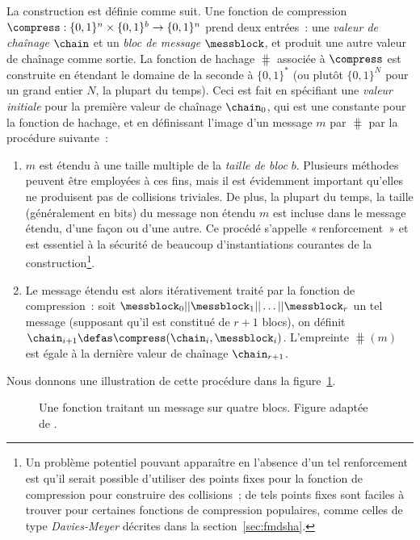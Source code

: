 La construction \merkdam est définie comme suit. Une fonction de compression
$\compress : \{0,1\}^n \times \{0,1\}^b \rightarrow \{0,1\}^n$
prend deux entrées~: une \emph{valeur de chaînage} $\chain$ et un \emph{bloc de message} $\messblock$, et produit une autre valeur de chaînage comme sortie.
La fonction de hachage
$\hash$ associée à $\compress$ est construite en étendant le domaine de la seconde à $\{0,1\}^*$ (ou plutôt $\{0,1\}^N$ pour un grand entier $N$, la plupart du temps).
Ceci est fait en spécifiant une \emph{valeur initiale} \iv pour la première valeur de chaînage
$\chain_0$, qui est une constante pour la fonction de hachage, et en définissant l'image d'un message
$m$ par $\hash$ par la procédure suivante~:
\begin{enumerate}
\item $m$ est étendu
à une taille multiple de la \emph{taille de bloc} $b$. Plusieurs méthodes peuvent être employées à ces fins, mais il est évidemment important
qu'elles ne produisent pas de collisions triviales. De plus, la plupart du temps, la taille (généralement en bits) du message non étendu
$m$ est incluse dans le message étendu, d'une façon ou d'une autre. Ce procédé s'appelle «\,renforcement \merkdam\,» et est essentiel
à la sécurité de beaucoup d'instantiations courantes de la construction\footnote{Un problème potentiel pouvant
apparaître en l'absence d'un tel renforcement est qu'il serait possible d'utiliser des points fixes pour la fonction de compression pour
construire des collisions~; de tels points fixes sont faciles à trouver pour certaines fonctions de compression populaires, comme celles de type
\emph{Davies-Meyer} décrites dans la section~\ref{sec:fmdsha}.}.
\item Le message étendu est alors itérativement traité par la fonction de compression~: soit
$\messblock_0||\messblock_1||\ldots||\messblock_r$ un tel message (supposant qu'il est constitué de
$r+1$ blocs), on définit $\chain_{i+1} \defas \compress(\chain_i, \messblock_i)$. L'empreinte $\hash(m)$ est égale à la dernière valeur de chaînage
$\chain_{r+1}$.
\end{enumerate}

Nous donnons une illustration de cette procédure dans la figure~\ref{fig:fmerk}.

\begin{figure}[!htb]
\begin{center}

\caption[Une fonction \merkdam traitant un message sur quatre blocs.]{Une fonction \merkdam traitant un message sur quatre blocs. Figure adaptée de \cite{TiKZ:Cryptographers}.\label{fig:fmerk}}
\end{center}
\end{figure} 


